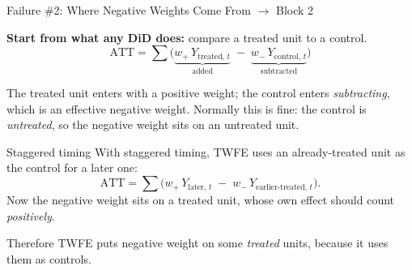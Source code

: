 \documentclass[main.tex]{subfiles}
\begin{document}
\begin{frame}{Failure \#2: Where Negative Weights Come From \hfill {\small$\rightarrow$ Block 2}}

  \textbf{Start from what any DiD does:} compare a treated unit to a control.
  \[
    \text{ATT} = \sum \Big( \underbrace{w_{+}\,Y_{\text{treated},\,t}}_{\text{added}}
      \;-\; \underbrace{w_{-}\,Y_{\text{control},\,t}}_{\text{subtracted}} \Big)
  \]

  The treated unit enters with a \alert{positive} weight; the control enters
  \emph{subtracting}, which is an effective \alert{negative} weight. Normally this is fine:
  the control is \emph{untreated}, so the negative weight sits on an untreated unit.

  \medskip
  \begin{alertblock}{Staggered timing}
    With staggered timing, TWFE uses an \alert{already-treated} unit as the control
    for a later one:
    \[
      \text{ATT} = \sum \Big( w_{+}\,Y_{\text{later},\,t}
        \;-\; w_{-}\,Y_{\text{earlier-treated},\,t}\Big).
    \]
    Now the negative weight sits on a \alert{treated} unit, whose own effect
    should count \emph{positively}.
  \end{alertblock}

  \medskip
  Therefore TWFE puts negative weight on some \emph{treated} units, because it
  uses them as controls.

\end{frame}
\end{document}
